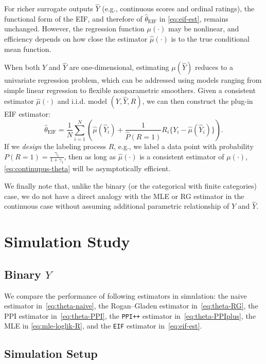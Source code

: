 \documentclass[11pt]{article}
\newcommand{\1}{\mathbf{1}}
\theoremstyle{remark}
\begin{document}
For richer surrogate outputs $\widehat Y$ (e.g., continuous scores and ordinal ratings), the functional form of the EIF, and therefore of
$\hat\theta_{\mathrm{EIF}}$ in \eqref{eq:eif-est}, remains unchanged. However, the
regression function $\mu(\cdot)$ may be nonlinear, and efficiency depends on how
close the estimator $\widehat{\mu}(\cdot)$ is to the true conditional mean function.

When both $Y$ and $\hat Y$ are one-dimensional, estimating $\mu(\hat Y)$ reduces to a univariate regression problem, which can be addressed using models ranging from simple linear regression to flexible nonparametric smoothers. Given a consistent estimator $\hat{\mu}(\cdot)$ and i.i.d. model $(Y,\hat Y, R)$, we can then construct the plug-in EIF estimator:
\begin{equation}
\label{eq:continupus-theta}
    \hat\theta_{\mathrm{EIF}} = \frac{1}{N} \sum_{i=1}^{N} \left( \hat{\mu}(\hat Y_i) + \frac{1}{\hat{P}(R=1)} R_i \{Y_i - \hat{\mu}(\hat Y_i)\} \right).
\end{equation}
If we \emph{design} the labeling process $R$, e.g., we  label a data point with probability $P(R=1)=\frac{\gamma_1}{1+\gamma_1}$, then as long as 
$\hat{\mu}(\cdot)$ is a consistent estimator of $\mu(\cdot)$, \eqref{eq:continupus-theta} will be asymptotically efficient. 

We finally note that, unlike the binary (or the categorical with finite categories) case, we do not have a direct analogy with the MLE or RG estimator in the continuous case without assuming additional parametric relationship of $Y$ and $\hat{Y}$. 

\section{Simulation Study}
\label{sec:simulation}

\subsection{Binary $Y$}

We compare the performance of following estimators in simulation:
  the naive estimator in~\eqref{eq:theta-naive}, the Rogan--Gladen estimator in~\eqref{eq:theta-RG}, the PPI estimator in~\eqref{eq:theta-PPI}, the \texttt{PPI++} estimator in~\eqref{eq:theta-PPIplus},
  the MLE in \eqref{eq:mle-loglik-R}, and the \texttt{EIF} estimator in~\eqref{eq:eif-est}.


\subsection{Simulation Setup}
\label{subsec:sim-setup}
\end{document}
